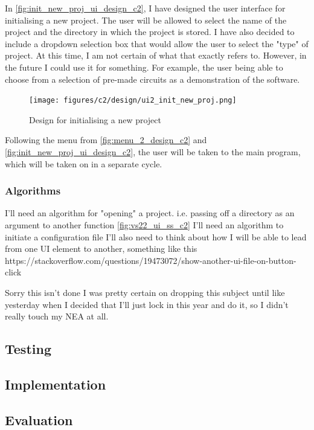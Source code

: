 \documentclass[11pt]{article}
\begin{document}
                In \autoref{fig:init_new_proj_ui_design_c2}, I have designed the user interface for initialising a new project. The user will be allowed to select the name of the project and the directory in which the project is stored. I have also decided to include a dropdown selection box that would allow the user to select the "type" of project. At this time, I am not certain of what that exactly refers to. However, in the future I could use it for something. For example, the user being able to choose from a selection of pre-made circuits as a demonstration of the software.

                \begin{figure}[!ht]
                    \centering
                    \texttt{[image: figures/c2/design/ui2\_init\_new\_proj.png]}
                    \caption{Design for initialising a new project}
                    \label{fig:init_new_proj_ui_design_c2}
                \end{figure}

                Following the menu from \autoref{fig:menu_2_design_c2} and \autoref{fig:init_new_proj_ui_design_c2}, the user will be taken to the main program, which will be taken on in a separate cycle.


            \subsubsection{Algorithms}
                I'll need an algorithm for "opening" a project. i.e. passing off a directory as an argument to another function \autoref{fig:vs22_ui_ss_c2}
                I'll need an algorithm to initiate a configuration file
                I'll also need to think about how I will be able to lead from one UI element to another, something like this https://stackoverflow.com/questions/19473072/show-another-ui-file-on-button-click


                Sorry this isn't done I was pretty certain on dropping this subject until like yesterday when I decided that I'll just lock in this year and do it, so I didn't really touch my NEA at all.
                
            
        \subsection{Testing}
        \subsection{Implementation}
        \subsection{Evaluation}
\end{document}
